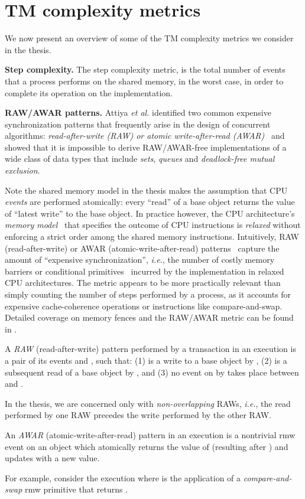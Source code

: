 \section{TM complexity metrics}
\label{sec:complexity}
We now present an overview of some of the TM complexity metrics we consider in the thesis.

\vspace{1mm}\noindent\textbf{Step complexity.}
The step complexity metric, is the total number of events that a process performs on the shared memory,
in the worst case, in order to complete its operation on the implementation.

\vspace{1mm}\noindent\textbf{RAW/AWAR patterns.}
Attiya \emph{et al.} identified two common expensive synchronization patterns that frequently arise in
the design of concurrent algorithms: \emph{read-after-write (RAW) or atomic write-after-read (AWAR)}~\cite{AGK11-popl,McKenney10}
and showed that it is 
impossible to derive RAW/AWAR-free implementations of
a wide class of data types that include \emph{sets}, \emph{queues} and \emph{deadlock-free mutual exclusion}.

Note the shared memory model in the thesis makes the assumption that CPU \emph{events} are performed atomically:
every ``read'' of a base object returns the value of ``latest write'' to the base object. In practice however,
the CPU architecture's \emph{memory model}~\cite{AdveG96} that specifies the outcome of CPU instructions
is \emph{relaxed} without enforcing a strict order among the shared memory instructions.
Intuitively, RAW (read-after-write) or AWAR (atomic-write-after-read)
patterns~\cite{AGK11-popl} capture the amount of ``expensive
synchronization'', \emph{i.e.}, the number of costly memory barriers or conditional primitives~\cite{AdveG96} incurred by the
implementation in relaxed CPU architectures.
The metric appears to be more practically relevant than simply counting the number of steps performed by a process, 
as it accounts for expensive cache-coherence operations or instructions like compare-and-swap.
Detailed coverage on memory fences and the RAW/AWAR metric can be found in \cite{McKenney10}.
\begin{definition}
A \emph{RAW} (read-after-write) pattern  performed by a transaction
 in an execution  
is a pair of its events  and , such that: (1)  is a write to a
base object  by , 
(2)  is a subsequent read of a base object  by , and 
(3) no event on  by  takes place between  and . 
\end{definition}
In the thesis, we are concerned only with \emph{non-overlapping} RAWs,
\emph{i.e.}, the read performed by one RAW precedes the write 
performed by the other RAW.
\begin{definition}
An \emph{AWAR} (atomic-write-after-read) pattern  in an execution
 is a nontrivial rmw event on an object  which
atomically returns the value of  (resulting after ) and updates  with a
new value.  
\end{definition}
For example, consider the execution  where  is the application of a \emph{compare-and-swap} rmw primitive that
returns .

